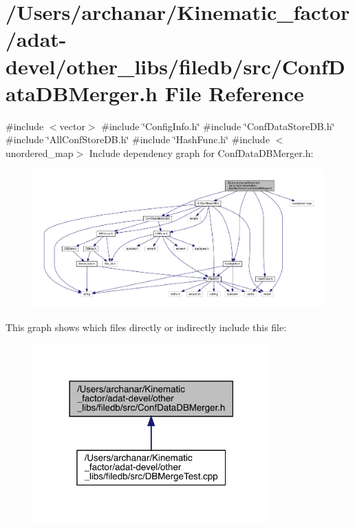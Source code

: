 \hypertarget{adat-devel_2other__libs_2filedb_2src_2ConfDataDBMerger_8h}{}\section{/\+Users/archanar/\+Kinematic\+\_\+factor/adat-\/devel/other\+\_\+libs/filedb/src/\+Conf\+Data\+D\+B\+Merger.h File Reference}
\label{adat-devel_2other__libs_2filedb_2src_2ConfDataDBMerger_8h}
{\ttfamily \#include $<$vector$>$}\newline
{\ttfamily \#include \char`\"{}Config\+Info.\+h\char`\"{}}\newline
{\ttfamily \#include \char`\"{}Conf\+Data\+Store\+D\+B.\+h\char`\"{}}\newline
{\ttfamily \#include \char`\"{}All\+Conf\+Store\+D\+B.\+h\char`\"{}}\newline
{\ttfamily \#include \char`\"{}Hash\+Func.\+h\char`\"{}}\newline
{\ttfamily \#include $<$unordered\+\_\+map$>$}\newline
Include dependency graph for Conf\+Data\+D\+B\+Merger.\+h\+:
\nopagebreak
\begin{figure}[H]
\begin{center}
\leavevmode
\includegraphics[width=350pt]{db/d39/adat-devel_2other__libs_2filedb_2src_2ConfDataDBMerger_8h__incl}
\end{center}
\end{figure}
This graph shows which files directly or indirectly include this file\+:
\nopagebreak
\begin{figure}[H]
\begin{center}
\leavevmode
\includegraphics[width=258pt]{d5/d35/adat-devel_2other__libs_2filedb_2src_2ConfDataDBMerger_8h__dep__incl}
\end{center}
\end{figure}
